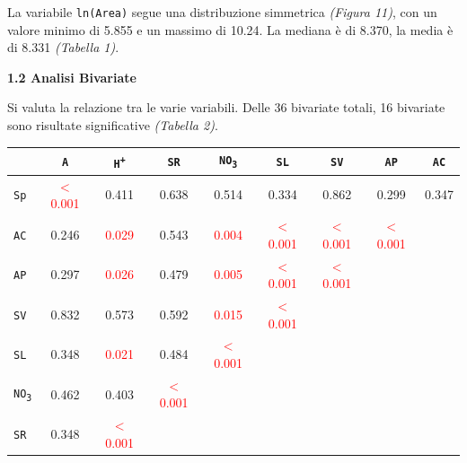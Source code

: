 \documentclass{article} %
\begin{document}
La variabile \texttt{ln(Area)} segue una distribuzione simmetrica \textit{(Figura 11)}, con un valore minimo di 5.855 e un massimo di 10.24. La mediana è di 8.370, la media è di 8.331 \textit{(Tabella 1)}.


\newpage
\begin{flushleft}
    \textbf{\Large 1.2 \: Analisi Bivariate}
\end{flushleft}
\vskip 10pt

Si valuta la relazione tra le varie variabili. Delle 36 bivariate totali, 16 bivariate sono risultate significative \textit{(Tabella 2)}.\\

\begin{table}[H]
    \centering
    \renewcommand{\arraystretch}{1.4} %
    \begin{tabular}{lcccccccc}
        \toprule
        & \texttt{A} & \texttt{H\textsuperscript{+}} & \texttt{SR} & \texttt{NO\textsubscript{3}} & \texttt{SL} & \texttt{SV} & \texttt{AP} & \texttt{AC} \\
        \midrule  
            \texttt{Sp} & \textcolor{red}{$<$0.001} & 0.411 & 0.638 & 0.514 & 0.334 & 0.862 & 0.299 & 0.347 \\
            \texttt{AC} & 0.246 & \textcolor{red}{0.029} & 0.543 & \textcolor{red}{0.004} & \textcolor{red}{$<$0.001} & \textcolor{red}{$<$0.001} & \textcolor{red}{$<$0.001} \\
            \texttt{AP} & 0.297 & \textcolor{red}{0.026} & 0.479 & \textcolor{red}{0.005} & \textcolor{red}{$<$0.001} & \textcolor{red}{$<$0.001} &  \\
            \texttt{SV} & 0.832 & 0.573 & 0.592 & \textcolor{red}{0.015} & \textcolor{red}{$<$0.001} &  & &  \\
            \texttt{SL} & 0.348 & \textcolor{red}{0.021} & 0.484 & \textcolor{red}{$<$0.001} &  &  &  \\
            \texttt{NO\textsubscript{3}} & 0.462 & 0.403 & \textcolor{red}{$<$0.001} &  &  &  & & \\
            \texttt{SR} & 0.348 & \textcolor{red}{$<$0.001} &  &  &  &  &  \\

\end{tabular}
\end{table}
\end{document}
